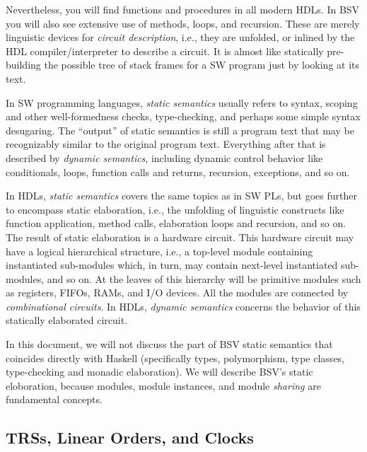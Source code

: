 \documentclass[11pt]{article}
\begin{document}
Nevertheless, you will find functions and procedures in all modern
HDLs.  In BSV you will also see extensive use of methods, loops, and
recursion.  These are merely linguistic devices for \emph{circuit
description}, i.e., they are unfolded, or inlined by the HDL
compiler/interpreter to describe a circuit.  It is almost like
statically pre-building the possible tree of stack frames for a SW
program just by looking at its text.

In SW programming languages, \emph{static semantics} usually refers to
syntax, scoping and other well-formedness checks, type-checking, and
perhaps some simple syntax desugaring.  The ``output'' of static
semantics is still a program text that may be recognizably similar to
the original program text.  Everything after that is described by
\emph{dynamic semantics}, including dynamic control behavior like
conditionals, loops, function calls and returns, recursion,
exceptions, and so on.

In HDLs, \emph{static semantics} covers the same topics as in SW PLs,
but goes further to encompass static elaboration, i.e., the unfolding
of linguistic constructs like function application, method calls,
elaboration loops and recursion, and so on.  The result of static
elaboration is a hardware circuit.  This hardware circuit may have a
logical hierarchical structure, i.e., a top-level module containing
instantiated sub-modules which, in turn, may contain next-level
instantiated sub-modules, and so on.  At the leaves of this hierarchy
will be primitive modules such as registers, FIFOs, RAMs, and I/O
devices.  All the modules are connected by \emph{combinational
circuits}.  In HDLs, \emph{dynamic semantics} concerns the behavior of
this statically elaborated circuit.

In this document, we will not discuss the part of BSV static semantics
that coincides directly with Haskell (specifically types,
polymorphism, type classes, type-checking and monadic elaboration).
We will describe BSV's static eloboration, because modules, module
instances, and module \emph{sharing} are fundamental concepts.


\subsection{TRSs, Linear Orders, and Clocks}
\end{document}

